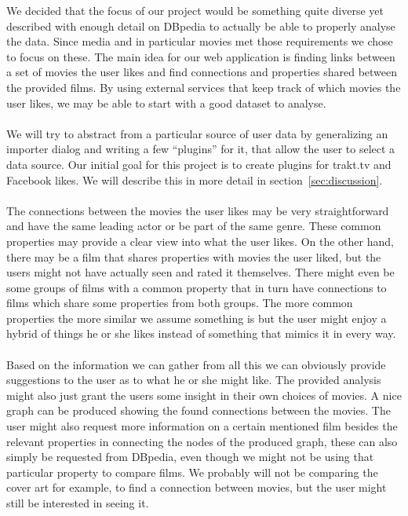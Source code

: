 We decided that the focus of our project would be something quite diverse yet described with enough detail on DBpedia to actually be able to properly analyse the data. Since media and in particular movies met those requirements we chose to focus on these. The main idea for our web application is finding links between a set of movies the user likes and find connections and properties shared between the provided films. By using external services that keep track of which movies the user likes, we may be able to start with a good dataset to analyse.

\paragraph{}
We will try to abstract from a particular source of user data by generalizing
an importer dialog and writing a few ``plugins'' for it, that allow the user
to select a data source.
Our initial goal for this project is to create plugins for trakt.tv and
Facebook likes.
We will describe this in more detail in section~\ref{sec:discussion}.

\paragraph{}
The connections between the movies the user likes may be very straightforward and have the same leading actor or be part of the same genre. These common properties may provide a clear view into what the user likes. On the other hand, there may be a film that shares properties with movies the user liked, but the users might not have actually seen and rated it themselves. There might even be some groups of films with a common property that in turn have connections to films which share some properties from both groups. The more common properties the more similar we assume something is but the user might enjoy a hybrid of things he or she likes instead of something that mimics it in every way.

\paragraph{}
Based on the information we can gather from all this we can obviously provide suggestions to the user as to what he or she might like. The provided analysis might also just grant the users some insight in their own choices of movies. A nice graph can be produced showing the found connections between the movies. The user might also request more information on a certain mentioned film besides the relevant properties in connecting the nodes of the produced graph, these can also simply be requested from DBpedia, even though we might not be using that particular property to compare films. We probably will not be comparing the cover art for example, to find a connection between movies, but the user might still be interested in seeing it.


